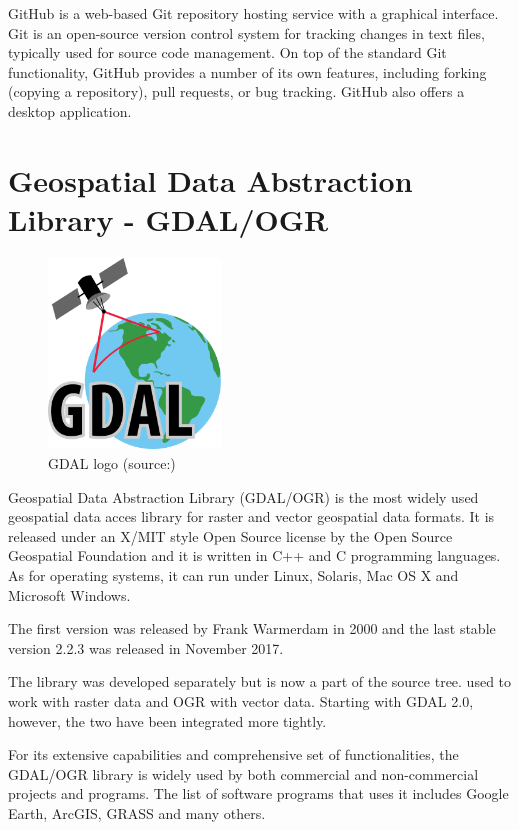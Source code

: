 GitHub is a web-based Git repository hosting service with a graphical interface. Git is an open-source version control system for tracking changes in text files, typically used for source code management.\cite{git}  On top of the standard Git functionality, GitHub provides a number of its own features, including forking (copying a repository), pull requests, or bug tracking. GitHub also offers a desktop application.

\section{Geospatial Data Abstraction Library - GDAL/OGR}

\begin{figure}[H] \centering
      \includegraphics[width=130pt]{./pictures/gdal.png}
      \caption[GDAL logo]{GDAL logo (source:{\cite{gdal}})}
      \label{fig:GDAL}
  \end{figure}

Geospatial Data Abstraction Library (GDAL/OGR) is the most widely used geospatial data acces library for raster and vector geospatial data formats. It is released under an X/MIT style Open Source license by the Open Source Geospatial Foundation and it is written in C++ and C programming languages. As for operating systems, it can run under Linux, Solaris, Mac OS X and Microsoft Windows.\cite{gdal}

The first version was released by Frank Warmerdam in 2000 and the last stable version 2.2.3 was released in November 2017.\cite{gdalrelease}


The  library was developed separately but is now a part of the  source tree.  used to work with raster data and OGR with vector data. Starting with GDAL 2.0, however, the two have been integrated more tightly.

For its extensive capabilities and comprehensive set of functionalities, the GDAL/OGR library is widely used by both commercial and non-commercial  projects and programs. The list of software programs that uses it includes Google Earth, ArcGIS, GRASS  and many others.\cite{gdalogr} 
